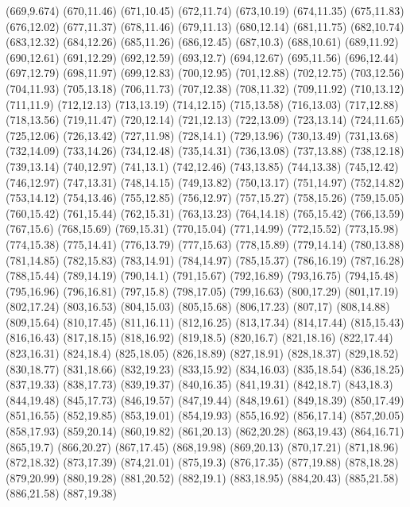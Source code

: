 (669,9.674)
(670,11.46)
(671,10.45)
(672,11.74)
(673,10.19)
(674,11.35)
(675,11.83)
(676,12.02)
(677,11.37)
(678,11.46)
(679,11.13)
(680,12.14)
(681,11.75)
(682,10.74)
(683,12.32)
(684,12.26)
(685,11.26)
(686,12.45)
(687,10.3)
(688,10.61)
(689,11.92)
(690,12.61)
(691,12.29)
(692,12.59)
(693,12.7)
(694,12.67)
(695,11.56)
(696,12.44)
(697,12.79)
(698,11.97)
(699,12.83)
(700,12.95)
(701,12.88)
(702,12.75)
(703,12.56)
(704,11.93)
(705,13.18)
(706,11.73)
(707,12.38)
(708,11.32)
(709,11.92)
(710,13.12)
(711,11.9)
(712,12.13)
(713,13.19)
(714,12.15)
(715,13.58)
(716,13.03)
(717,12.88)
(718,13.56)
(719,11.47)
(720,12.14)
(721,12.13)
(722,13.09)
(723,13.14)
(724,11.65)
(725,12.06)
(726,13.42)
(727,11.98)
(728,14.1)
(729,13.96)
(730,13.49)
(731,13.68)
(732,14.09)
(733,14.26)
(734,12.48)
(735,14.31)
(736,13.08)
(737,13.88)
(738,12.18)
(739,13.14)
(740,12.97)
(741,13.1)
(742,12.46)
(743,13.85)
(744,13.38)
(745,12.42)
(746,12.97)
(747,13.31)
(748,14.15)
(749,13.82)
(750,13.17)
(751,14.97)
(752,14.82)
(753,14.12)
(754,13.46)
(755,12.85)
(756,12.97)
(757,15.27)
(758,15.26)
(759,15.05)
(760,15.42)
(761,15.44)
(762,15.31)
(763,13.23)
(764,14.18)
(765,15.42)
(766,13.59)
(767,15.6)
(768,15.69)
(769,15.31)
(770,15.04)
(771,14.99)
(772,15.52)
(773,15.98)
(774,15.38)
(775,14.41)
(776,13.79)
(777,15.63)
(778,15.89)
(779,14.14)
(780,13.88)
(781,14.85)
(782,15.83)
(783,14.91)
(784,14.97)
(785,15.37)
(786,16.19)
(787,16.28)
(788,15.44)
(789,14.19)
(790,14.1)
(791,15.67)
(792,16.89)
(793,16.75)
(794,15.48)
(795,16.96)
(796,16.81)
(797,15.8)
(798,17.05)
(799,16.63)
(800,17.29)
(801,17.19)
(802,17.24)
(803,16.53)
(804,15.03)
(805,15.68)
(806,17.23)
(807,17)
(808,14.88)
(809,15.64)
(810,17.45)
(811,16.11)
(812,16.25)
(813,17.34)
(814,17.44)
(815,15.43)
(816,16.43)
(817,18.15)
(818,16.92)
(819,18.5)
(820,16.7)
(821,18.16)
(822,17.44)
(823,16.31)
(824,18.4)
(825,18.05)
(826,18.89)
(827,18.91)
(828,18.37)
(829,18.52)
(830,18.77)
(831,18.66)
(832,19.23)
(833,15.92)
(834,16.03)
(835,18.54)
(836,18.25)
(837,19.33)
(838,17.73)
(839,19.37)
(840,16.35)
(841,19.31)
(842,18.7)
(843,18.3)
(844,19.48)
(845,17.73)
(846,19.57)
(847,19.44)
(848,19.61)
(849,18.39)
(850,17.49)
(851,16.55)
(852,19.85)
(853,19.01)
(854,19.93)
(855,16.92)
(856,17.14)
(857,20.05)
(858,17.93)
(859,20.14)
(860,19.82)
(861,20.13)
(862,20.28)
(863,19.43)
(864,16.71)
(865,19.7)
(866,20.27)
(867,17.45)
(868,19.98)
(869,20.13)
(870,17.21)
(871,18.96)
(872,18.32)
(873,17.39)
(874,21.01)
(875,19.3)
(876,17.35)
(877,19.88)
(878,18.28)
(879,20.99)
(880,19.28)
(881,20.52)
(882,19.1)
(883,18.95)
(884,20.43)
(885,21.58)
(886,21.58)
(887,19.38)
